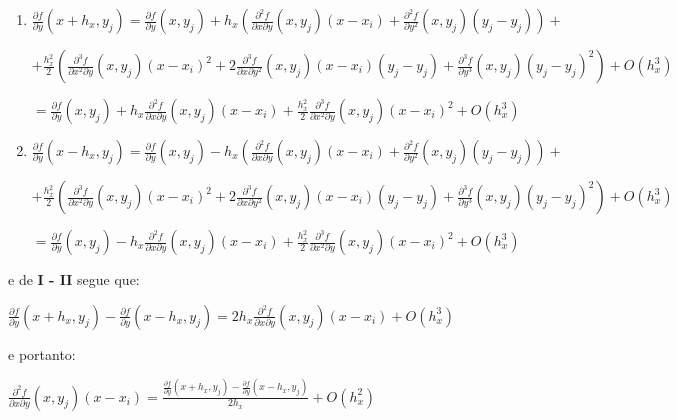 \documentclass[11pt]{article}
\begin{document}
  \begin{enumerate}[label=\textbf{\Roman*)}]
    \item $\frac{\partial f}{\partial y}(x + h_x, y_j) = \frac{\partial f}{\partial y}(x, y_j) + h_x\left(\frac{\partial^2 f}{\partial x \partial y}\left(x, y_j \right)\left(x - x_i \right) + \frac{\partial^2 f}{\partial y^2}\left(x, y_j \right)\left(y_j - y_j \right) \right) +$

    $+ \frac{h_x^2}{2}\left(\frac{\partial^3 f}{\partial x^2 \partial y}\left(x, y_j\right)\left(x - x_i\right)^2 + 2\frac{\partial^3 f}{\partial x \partial y^2}\left(x, y_j \right)\left(x - x_i\right)\left(y_j - y_j\right) +
    \frac{\partial^3 f}{\partial y^3}\left(x, y_j\right)\left(y_j - y_j\right)^2 \right) + O(h_x^3)$

    $= \frac{\partial f}{\partial y}(x, y_j) + h_x\frac{\partial^2 f}{\partial x \partial y}\left(x, y_j \right)\left(x - x_i \right) + \frac{h_x^2}{2}\frac{\partial^3 f}{\partial x^2 \partial y}\left(x, y_j\right)\left(x - x_i\right)^2 + O(h_x^3)$


    \item $\frac{\partial f}{\partial y}(x - h_x, y_j) = \frac{\partial f}{\partial y}(x, y_j) - h_x\left(\frac{\partial^2 f}{\partial x \partial y}\left(x, y_j \right)\left(x - x_i \right) + \frac{\partial^2 f}{\partial y^2}\left(x, y_j \right)\left(y_j - y_j \right) \right) +$

    $+ \frac{h_x^2}{2}\left(\frac{\partial^3 f}{\partial x^2 \partial y}\left(x, y_j\right)\left(x - x_i\right)^2 + 2\frac{\partial^3 f}{\partial x \partial y^2}\left(x, y_j \right)\left(x - x_i\right)\left(y_j - y_j\right) +
    \frac{\partial^3 f}{\partial y^3}\left(x, y_j\right)\left(y_j - y_j\right)^2 \right) + O(h_x^3)$

    $= \frac{\partial f}{\partial y}(x, y_j) - h_x\frac{\partial^2 f}{\partial x \partial y}\left(x, y_j \right)\left(x - x_i \right) + \frac{h_x^2}{2}\frac{\partial^3 f}{\partial x^2 \partial y}\left(x, y_j\right)\left(x - x_i\right)^2 + O(h_x^3)$
  \end{enumerate}

  e de \textbf{I - II} segue que:

  $\frac{\partial f}{\partial y}(x + h_x, y_j) - \frac{\partial f}{\partial y}(x - h_x, y_j) = 2h_x\frac{\partial^2 f}{\partial x \partial y}\left(x, y_j \right)\left(x - x_i \right) + O(h_x^3)$

  e portanto:

  $\frac{\partial^2 f}{\partial x \partial y}\left(x, y_j \right)\left(x - x_i \right) = \frac{\frac{\partial f}{\partial y}(x + h_x, y_j) - \frac{\partial f}{\partial y}(x - h_x, y_j)}{2h_x}  + O(h_x^2)$
\end{document}
